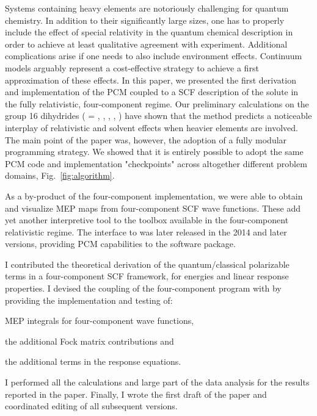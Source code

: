 Systems containing heavy elements are notoriously challenging for quantum chemistry.
In addition to their significantly large sizes, one has to properly include the
effect of special relativity in the quantum chemical description in order to
achieve at least qualitative agreement with experiment.
Additional complications arise if one needs to also include environment effects.
Continuum models arguably represent a cost-effective strategy to achieve a first
approximation of these effects.
In this paper, we presented the first derivation and implementation of the \acs{PCM}
coupled to a \acs{SCF} description of the solute in the fully relativistic, four-component
regime.
Our preliminary calculations on the group 16 dihydrides  ( =
, , , , ) have shown that the method predicts
a noticeable interplay of relativistic and solvent effects when heavier
elements are involved.
The main point of the paper was, however, the adoption of a fully modular
programming strategy. We showed that it is entirely possible to adopt the same
\acs{PCM} code and implementation "checkpoints" across altogether different
problem domains, Fig.~\ref{fig:algorithm}.

As a by-product of the four-component implementation, we were able to obtain and visualize \acs{MEP} maps
from four-component \acs{SCF} wave functions. These add yet another interpretive tool to the toolbox available
in the four-component relativistic regime.
The interface to \DIRAC was later released in the 2014 and later versions,
providing \acs{PCM} capabilities to the software package.

I contributed the theoretical derivation of the quantum/classical polarizable
terms in a four-component \acs{SCF} framework, for energies and linear response
properties. I devised the coupling of the four-component program \DIRAC with
\pcmsolver by providing the implementation and testing of:
\begin{enumerate*}[label={\alph*)},font={\color{PMS1797}}]
  \item \acs{MEP} integrals for four-component wave functions,
  \item the additional Fock matrix contributions and
  \item the additional terms in the response equations.
\end{enumerate*}
I performed all the calculations and large part of the data analysis
for the results reported in the paper.
Finally, I wrote the first draft of the paper and coordinated editing of
all subsequent versions.

